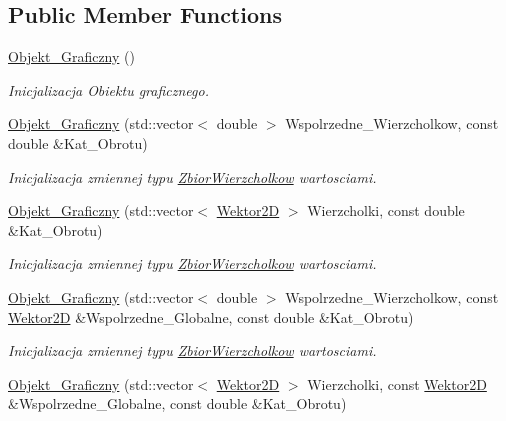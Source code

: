 \subsection*{Public Member Functions}
\begin{DoxyCompactItemize}
\item 
\hypertarget{class_objekt___graficzny_a77cf5352485959ba5b511e6241080e1c}{\hyperlink{class_objekt___graficzny_a77cf5352485959ba5b511e6241080e1c}{Objekt\+\_\+\+Graficzny} ()}\label{class_objekt___graficzny_a77cf5352485959ba5b511e6241080e1c}

\begin{DoxyCompactList}\small\item\em Inicjalizacja Obiektu graficznego. \end{DoxyCompactList}\item 
\hyperlink{class_objekt___graficzny_a78795f7fdc63bcfa813dccafe689dbad}{Objekt\+\_\+\+Graficzny} (std\+::vector$<$ double $>$ Wspolrzedne\+\_\+\+Wierzcholkow, const double \&Kat\+\_\+\+Obrotu)
\begin{DoxyCompactList}\small\item\em Inicjalizacja zmiennej typu \hyperlink{class_zbior_wierzcholkow}{Zbior\+Wierzcholkow} wartosciami. \end{DoxyCompactList}\item 
\hyperlink{class_objekt___graficzny_a02028426a39d3b8be08b183adbf291c3}{Objekt\+\_\+\+Graficzny} (std\+::vector$<$ \hyperlink{class_wektor2_d}{Wektor2\+D} $>$ Wierzcholki, const double \&Kat\+\_\+\+Obrotu)
\begin{DoxyCompactList}\small\item\em Inicjalizacja zmiennej typu \hyperlink{class_zbior_wierzcholkow}{Zbior\+Wierzcholkow} wartosciami. \end{DoxyCompactList}\item 
\hyperlink{class_objekt___graficzny_aafb4740ff40c5719ff2da044a0797d2b}{Objekt\+\_\+\+Graficzny} (std\+::vector$<$ double $>$ Wspolrzedne\+\_\+\+Wierzcholkow, const \hyperlink{class_wektor2_d}{Wektor2\+D} \&Wspolrzedne\+\_\+\+Globalne, const double \&Kat\+\_\+\+Obrotu)
\begin{DoxyCompactList}\small\item\em Inicjalizacja zmiennej typu \hyperlink{class_zbior_wierzcholkow}{Zbior\+Wierzcholkow} wartosciami. \end{DoxyCompactList}\item 
\hyperlink{class_objekt___graficzny_a116ad8942cd4217c5eb288e4a21dce20}{Objekt\+\_\+\+Graficzny} (std\+::vector$<$ \hyperlink{class_wektor2_d}{Wektor2\+D} $>$ Wierzcholki, const \hyperlink{class_wektor2_d}{Wektor2\+D} \&Wspolrzedne\+\_\+\+Globalne, const double \&Kat\+\_\+\+Obrotu)

\end{DoxyCompactItemize}
